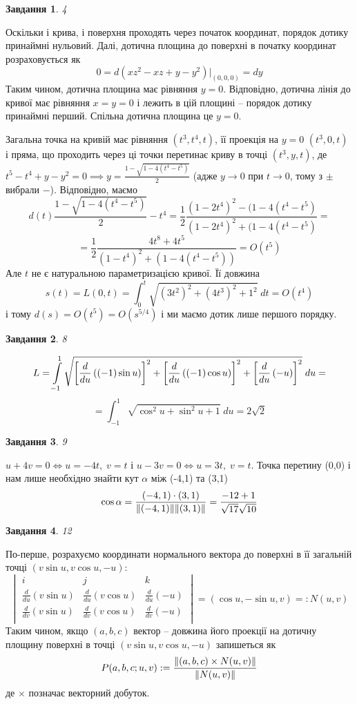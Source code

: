 \documentclass[8pt]{article} %
\title{}
\newtheorem*{prob}{Завдання}
\begin{document}
\maketitle
\begin{prob}4\end{prob}
	Оскільки і крива, і поверхня проходять через початок координат, порядок дотику принаймні нульовий.
	Далі, дотична площина до поверхні в початку
	координат розраховується як
	\[0=d(xz^2-xz+y-y^2)\bigg|_{(0,0,0)}=dy\]
	Таким чином, дотична площина має рівняння $y=0$. Відповідно, дотична лінія до кривої має рівняння $x=y=0$ і лежить в цій площині -- 
	порядок дотику принаймні перший. Спільна дотична площина це $y=0$.

	Загальна точка на кривій має рівняння $(t^3,t^4,t)$, її проекція на $y=0$ $(t^3,0,t)$ і пряма, що проходить через ці точки перетинає
	криву в точці $(t^3,y,t)$, де $t^5-t^4+y-y^2=0\implies y=\frac{1-\sqrt{1-4(t^4-t^5)}}{2}$ (адже $y\to0$ при $t\to0$, тому з $\pm$ вибрали
	$-$). Відповідно, маємо
	\[d(t)\frac{1-\sqrt{1-4(t^4-t^5)}}{2}-t^4=\frac{1}{2}\frac{(1-2t^4)^2-(1-4(t^4-t^5)}{(1-2t^4)^2+(1-4(t^4-t^5)}=\]
	\[=\frac{1}{2}\frac{4t^8+4t^5}{(1-t^4)^2+(1-4(t^4-t^5))}=O(t^5)\]
	Але $t$ не є натуральною параметризацією кривої. Її довжина
	\[s(t)=L(0,t)=\int_0^t\sqrt{(3t^2)^2+(4t^3)^2+1^2}\;dt=O(t^4)\]
	і тому $d(s)=O(t^5)=O(s^{5/4})$ і ми маємо дотик лише першого порядку.
\begin{prob}8\end{prob}
	\[L=\int_{-1}^1\sqrt{\mysbra{\frac{d}{du}\mybra{(-1)\sin u}}^2+
	\mysbra{\frac{d}{du}\mybra{(-1)\cos u}}^2+
	\mysbra{\frac{d}{du}\mybra{-u}}^2}\;du=\]
	\[=\int_{-1}^1\sqrt{\cos^2u+\sin^2u+1}\;du=2\sqrt{2}\]
\begin{prob}9\end{prob}
	$u+4v=0\iff u=-4t,\;v=t$ і $u-3v=0\iff u=3t,\;v=t$. Точка перетину (0,0) і нам лише необхідно знайти кут $\alpha$ між
	(-4,1) та (3,1)
	\[\cos\alpha=\frac{(-4,1)\cdot(3,1)}{\|(-4,1)\|\|(3,1)\|}=\frac{-12+1}{\sqrt{17}\sqrt{10}}\]
\begin{prob}12\end{prob}
	По-перше, розрахуємо координати нормального вектора до поверхні в її загальній точці $(v\sin u,v\cos u,-u)$:
	\[\begin{vmatrix}i&j&k\\
		\frac{d}{du}(v\sin u) & 
		\frac{d}{du}(v\cos u) & 
		\frac{d}{du}(-u) \\
		\frac{d}{dv}(v\sin u) & 
		\frac{d}{dv}(v\cos u) & 
		\frac{d}{dv}(-u) \\
	\end{vmatrix}=(\cos u,-\sin u,v)=:N(u,v)\]
	Таким чином, якщо $(a,b,c)$ вектор -- довжина його проекції на дотичну площину поверхні в точці  $(v\sin u,v\cos u,-u)$
	запишеться як
	\[P(a,b,c;u,v):=\frac{\|(a,b,c)\times N(u,v)\|}{\|N(u,v)\|}\]
	де $\times$ позначає векторний добуток.
\end{document}
